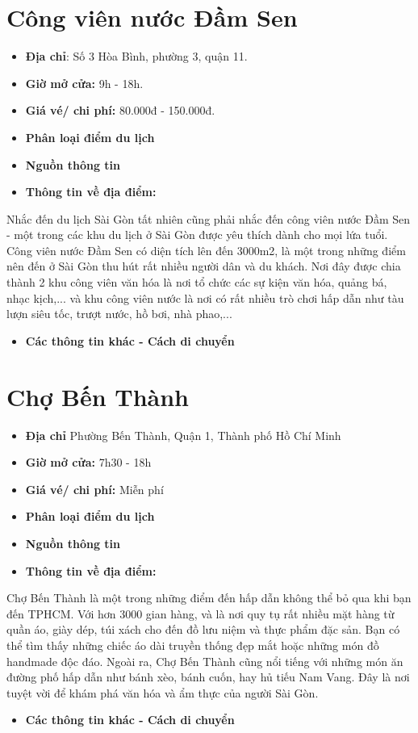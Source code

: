 \documentclass{article}
\begin{document}
\section{Công viên nước Đầm Sen}
\begin{itemize}
    \item{\textbf{Địa chỉ}: Số 3 Hòa Bình, phường 3, quận 11.}
    \item{\textbf{Giờ mở cửa:} 9h - 18h.}
    \item{\textbf{Giá vé/ chi phí:} 80.000đ - 150.000đ.}
    \item{\textbf{Phân loại điểm du lịch} }
    \item{\textbf{Nguồn thông tin}}
    \item{\textbf{Thông tin về địa điểm:}}
\end{itemize}
Nhắc đến du lịch Sài Gòn tất nhiên cũng phải nhắc đến công viên nước Đầm Sen - một trong các khu du lịch ở Sài Gòn được yêu thích dành cho mọi lứa tuổi. Công viên nước Đầm Sen có diện tích lên đến 3000m2, là một trong những điểm nên đến ở Sài Gòn thu hút rất nhiều người dân và du khách. Nơi đây được chia thành 2 khu công viên văn hóa là nơi tổ chức các sự kiện văn hóa, quảng bá, nhạc kịch,... và khu công viên nước là nơi có rất nhiều trò chơi hấp dẫn như tàu lượn siêu tốc, trượt nước, hồ bơi, nhà phao,...
\begin{itemize}
    \item{\textbf{Các thông tin khác - Cách di chuyển}}
\end{itemize}

\section{Chợ Bến Thành}
\begin{itemize}
    \item{\textbf{Địa chỉ}} Phường Bến Thành, Quận 1, Thành phố Hồ Chí Minh
    \item{\textbf{Giờ mở cửa:}} 7h30 - 18h
    \item{\textbf{Giá vé/ chi phí:}} Miễn phí
    \item{\textbf{Phân loại điểm du lịch} }
    \item{\textbf{Nguồn thông tin}}
    \item{\textbf{Thông tin về địa điểm:}}
\end{itemize}
Chợ Bến Thành là một trong những điểm đến hấp dẫn không thể bỏ qua khi bạn đến TPHCM. Với hơn 3000 gian hàng, và là nơi quy tụ rất nhiều mặt hàng từ quần áo, giày dép, túi xách cho đến đồ lưu niệm và thực phẩm đặc sản. Bạn có thể tìm thấy những chiếc áo dài truyền thống đẹp mắt hoặc những món đồ handmade độc đáo. Ngoài ra, Chợ Bến Thành cũng nổi tiếng với những món ăn đường phố hấp dẫn như bánh xèo, bánh cuốn, hay hủ tiếu Nam Vang. Đây là nơi tuyệt vời để khám phá văn hóa và ẩm thực của người Sài Gòn.
\begin{itemize}
    \item{\textbf{Các thông tin khác - Cách di chuyển}}
\end{itemize}
\end{document}
